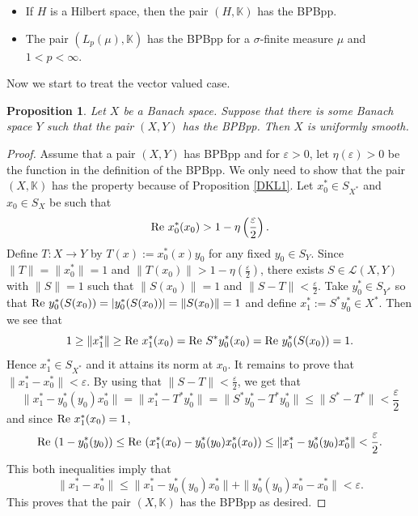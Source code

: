 \documentclass[12pt,a4paper]{amsart}
\newtheorem{proposition}[theorem]{Proposition}
\theoremstyle{definition}
\newcommand{\e}{\varepsilon}
\DeclareMathOperator{\re}{Re}
\numberwithin{equation}{section}
\newcommand{\K}{\mathbb{K}} %
\def\K{{\mathbb K}}
\def\re{\hbox{\rm Re~}}
\begin{document}
\begin{itemize}
\item[(a)] If $H$ is a Hilbert space, then the pair $(H, \K)$ has the BPBpp.
\item[(b)] The pair $(L_p(\mu), \K)$ has the BPBpp for a $\sigma$-finite measure $\mu$ and $1 < p < \infty$.
\end{itemize}

Now we start to treat the vector valued case. 

\begin{proposition} Let $X$ be a Banach space. Suppose that there is some Banach space $Y$ such that the pair $(X, Y)$ has the BPBpp. Then $X$ is uniformly smooth.	
\label{DKL2}
\end{proposition}
\begin{proof} Assume that  a pair $(X, Y)$ has BPBpp and for $\e > 0$,  let $\eta(\e) > 0$  be the function in the definition of the BPBpp. We only need to show that the pair $(X, \K)$ has the property because of Proposition \ref{DKL1}. Let $x_0^* \in S_{X^*}$ and $x_0 \in S_X$ be such that
\begin{equation*}	
\re x_0^*(x_0) > 1 - \eta \left( \frac{\e}{2} \right).
\end{equation*}
Define $T: X \longrightarrow Y$ by $T(x) := x_0^*(x)y_0$ for any fixed $y_0 \in S_{Y}$. Since $\|T\| = \|x_0^*\| = 1$ and $\|T(x_0)\| > 1 - \eta(\frac{\e}{2})$, there exists $S \in \mathcal{L}(X, Y)$ with $\|S\| = 1$ such that $\|S(x_0)\| = 1$ and $\|S - T\| < \frac{\e}{2}$. Take $y_0^* \in S_{Y^*}$ so that $\re y_0^* (S(x_0)) = |y_0^*(S(x_0))| = \|S(x_0)\| = 1$ and define $x_1^* := S^*y_0^* \in X^*$. Then we see that  
\begin{equation*}
1\geq \|x_1^*\|\geq \re x_1^*(x_0) = \re S^*y_0^*(x_0) = \re y_0^*(S(x_0)) = 1. 
\end{equation*}
Hence $x_1^* \in S_{X^*}$ and it attains its norm at $x_0$. It remains to prove that $\|x_1^* - x_0^*\| < \e$. By using that $\|S - T\| < \frac{\e}{2}$, we get that
\begin{equation*}
\|x_1^* - y_0^*(y_0)x_0^*\| = \|x_1^* - T^*y_0^*\| = \|S^* y_0^* - T^* y_0^*\| \leq \|S^* - T^*\| < \frac{\e}{2}
\end{equation*}
and since $\re x_1^*(x_0) = 1$,
\begin{equation*}
\re (1 - y_0^*(y_0)) \leq \re (x_1^*(x_0) - y_0^*(y_0)x_0^*(x_0)) \leq \|x_1^* - y_0^*(y_0)x_0^*\| < \frac{\e}{2}.
\end{equation*}
This both inequalities imply that
\begin{equation*}
\|x_1^* - x_0^*\| \leq \|x_1^* - y_0^*(y_0)x_0^*\| + \|y_0^*(y_0)x_0^* - x_0^*\| < \e.
\end{equation*}
This proves that the pair $(X, \K)$ has the BPBpp as desired.
\end{proof}
\end{document}
